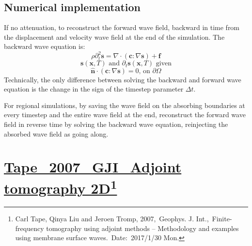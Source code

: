\documentclass{article}
\newcommand{\Ppath}{/home/tche/Learning/Learning/Paper/}
\newcommand{\prf}{This is relative path from \Papth to the paper file}
\newcommand{\pmk}{This is the brief info.}
\newcommand{\pti}{This is the paper tile}
\newcommand{\pay}{These are authors and year}
\newcommand{\pjo}{This is the journal}
\newcommand{\pda}{This is the date}
\newcommand{\refp}[1]{\href{run:\Ppath\prf}{#1}}
\newcommand{\pinfo}{\refp{\pmk}\footnote{\pay,~\pjo,~\pti.~Date:~\pda}}
\newcommand{\mbf}[1]{\mathbf{#1}}
\begin{document}
\subsection{Numerical implementation}
If no attenuation, to reconstruct the forward wave field, backward in time from the displacement and velocity wave field at the end of the simulation. The backward wave equation is:
\[ \rho\partial_t^2\mbf s=\nabla\cdot(\mbf c:\nabla\mbf s)+\mbf f \]
\[ \mbf s(\mbf x,T) \text{ and } \partial_t\mbf s(\mbf x,T) \text{ given} \]
\[ \hat{\mbf n}\cdot(\mbf c:\nabla\mbf s)=0 \text{, on } \partial\Omega \]
Technically, the only difference between solving the backward and forward wave equation is the change in the sign of the timestep parameter $\Delta t$.\par
For regional simulations, by saving the wave field on the absorbing boundaries at every timestep and the entire wave field at the end, reconstruct the forward wave field in reverse time by solving the backward wave equation, reinjecting the absorbed wave field as going along.\par
\vspace{5mm}

\renewcommand{\pmk}{Tape\_2007\_GJI\_Adjoint tomography 2D}
\renewcommand{\prf}{FWI/\pmk.pdf}
\renewcommand{\pti}{Finite-frequency tomography using adjoint methods -- Methodology and examples using membrane surface waves}
\renewcommand{\pay}{Carl Tape, Qinya Liu and Jeroen Tromp, 2007}
\renewcommand{\pjo}{Geophys. J. Int.}
\renewcommand{\pda}{2017/1/30 Mon.}
\section{\pinfo}
\end{document}
